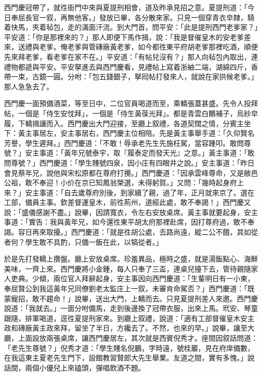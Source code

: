 西門慶冠帶了，就徃衙門中來與夏提刑相會，道及昨承見招之意。夏提刑道：「今日奉屈長官一叙，再無他客。」發放已畢，各分散來家。只見一個穿青衣皁隸，騎着快馬，夾着毡包，走的滿面汗流。到大門首，問平安：「此是提刑西門老爹家？」平安道：「你是那裡來的？」那人即便下馬作揖，說：「我是督催皇木的安老爹差來，送禮與老爹。俺老爹與管磚廠黃老爹，如今都徃東平府胡老爹那裡吃酒，順便先來拜老爹，看老爹在家不在。」平安道：「有帖兒沒有？」那人向毡包內取出，連禮物都遞與平安。平安拏進去與西門慶看，見禮帖上寫着浙紬二端，湖綿四斤，香帶一束，古鏡一圓。分咐：「包五錢銀子，拏囘帖打發來人，就說在家拱候老爹。」那人急急去了。

西門慶一面預備酒菜，等至日中，二位官員喝道而至，乘轎張蓋甚盛。先令人投拜帖，一個是「侍生安忱拜」，一個是「侍生黃葆光拜」。都是青雲白鷳補子，烏紗皁履，下轎揖讓而入。西門慶出大門迎接，至廳上叙禮，各道契闊之情，分賓主坐下：黃主事居左，安主事居右，西門慶主位相陪。先是黃主事舉手道：「久仰賢名芳譽，學生遲拜。」西門慶道：「不敢！辱承老先生先施枉駕，當容踵叩。敢問尊號？」安主事道：「黃年兄號泰宇，取『履泰定而發天光』之意。」黃主事道：「敢問尊號？」西門慶道：「學生賤號四泉，因小庄有四眼井之說。」{}安主事道：「昨日會見蔡年兄，說他與宋松原都在尊府打攪。」西門慶道：「因承雲峰尊命，又是敝邑公祖，敢不奉迎！小价在京已知鳳翁榮選，未得躬賀。」又問：「幾時起身府上來？」安主事道：「自去歲尊府別後，到家續了親，過了年，正月就來京了。選在工部，備員主事。欽差督運皇木，前徃荊州，道經此處，敢不奉謁！」西門慶又說：「盛儀感謝不盡。」說畢，因請寬衣，令左右安放桌席。黃主事就要起身，安主事道：「實告：我與黃年兄，如今還徃東平胡太府那裡赴席，因打尊府過，敢不奉謁。容日再來取擾。」西門慶道：「就是徃胡公處，去路尚遠，縱二公不餓，其如從者何？學生敢不具酌，只備一飯在此，以犒從者。」

於是先打發轎上攢盤。廳上安放桌席。珍羞異品，極時之盛，就是湯飯點心、海鮮美味，一齊上來。西門慶將小金鍾，每人只奉了三盃，連桌兒擡下去，管待親隨家人吏典。少傾，兩位官人拜辭起身，安主事因向西門慶道：「生輩明日有一小東，奉屈賢公到我這黃年兄同僚劉老太監庄上一叙，未審肯命駕否？」西門慶道：「既蒙寵招，敢不趨命！」說畢，送出大門，上轎而去。只見夏提刑差人來邀。西門慶說道：「我就去。」一面分咐備馬，走到後邊換了冠帶衣服，出來上馬。玳安、琴童跟隨，排軍喝道，逕徃夏提刑家來。到廳上叙禮，說道：「適有工部督催皇木安主政和磚廠黃主政來拜，留坐了半日，方纔去了。不然，也來的早。」說畢，讓至大廳，上面設放兩張桌席，讓西門慶居左，其次就是西賓倪秀才。{}座間因叙話問道：「老先生尊號？」倪秀才道：「學生賤名倪鵬，字時遠，號桂巖，見在府庠備數，在我這東主夏老先生門下，設館教習賢郎大先生舉業。友道之間，實有多愧。」說話間，兩個小優兒上來磕頭，彈唱飲酒不題。

